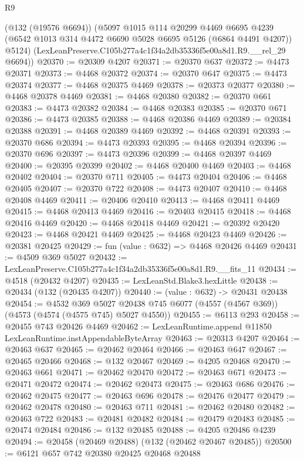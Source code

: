 \begin{lexlean}{R9}
\begin{coremodule}
      (@132 (@19576 @6694))
      (@5097
        @1015
        @114
        @20299
        @4469
        @6695
        @4239
        (@6542 @1013 @314 @4472 @6690 @5028 @6695 @5126 (@6864 @4491 @4207))
        @5124)
      (LexLeanPreserve.C105b277a4c1f34a2db35336f5e00a8d1.R9.__rel_29 @6694))
@20370 := @20309 @4207
@20371 := @20370 @637
@20372 := @4473 @20371
@20373 := @4468 @20372
@20374 := @20370 @647
@20375 := @4473 @20374
@20377 := @4468 @20375 @4469
@20378 := @20373 @20377
@20380 := @4468 @20378 @4469
@20381 := @4468 @20380
@20382 := @20370 @661
@20383 := @4473 @20382
@20384 := @4468 @20383
@20385 := @20370 @671
@20386 := @4473 @20385
@20388 := @4468 @20386 @4469
@20389 := @20384 @20388
@20391 := @4468 @20389 @4469
@20392 := @4468 @20391
@20393 := @20370 @686
@20394 := @4473 @20393
@20395 := @4468 @20394
@20396 := @20370 @696
@20397 := @4473 @20396
@20399 := @4468 @20397 @4469
@20400 := @20395 @20399
@20402 := @4468 @20400 @4469
@20403 := @4468 @20402
@20404 := @20370 @711
@20405 := @4473 @20404
@20406 := @4468 @20405
@20407 := @20370 @722
@20408 := @4473 @20407
@20410 := @4468 @20408 @4469
@20411 := @20406 @20410
@20413 := @4468 @20411 @4469
@20415 := @4468 @20413 @4469
@20416 := @20403 @20415
@20418 := @4468 @20416 @4469
@20420 := @4468 @20418 @4469
@20421 := @20392 @20420
@20423 := @4468 @20421 @4469
@20425 := @4468 @20423 @4469
@20426 := @20381 @20425
@20429 := fun (value : @632) => @4468 @20426 @4469
@20431 := @4509 @369 @5027
@20432 := LexLeanPreserve.C105b277a4c1f34a2db35336f5e00a8d1.R9.__fits_11
@20434 := @4518 (@20432 @4207)
@20435 := LexLeanStd.Blake3.hexLittle
@20438 := @20434 (@132 (@20435 @4207))
@20440 := (value : @632) -> @20431 @20438
@20454 := @4532
    @369
    @5027
    @20438
    @745
    @6077
    (@4557 (@4567 @369))
    (@4573 (@4574 (@4575 @745) @5027 @4550))
@20455 := @6113 @293
@20458 := @20455 @743 @20426 @4469
@20462 := LexLeanRuntime.append @11850 LexLeanRuntime.instAppendableByteArray
@20463 := @20313 @4207
@20464 := @20463 @637
@20465 := @20462 @20464
@20466 := @20463 @647
@20467 := @20465 @20466
@20468 := @132 @20467
@20469 := @4205 @20468
@20470 := @20463 @661
@20471 := @20462 @20470
@20472 := @20463 @671
@20473 := @20471 @20472
@20474 := @20462 @20473
@20475 := @20463 @686
@20476 := @20462 @20475
@20477 := @20463 @696
@20478 := @20476 @20477
@20479 := @20462 @20478
@20480 := @20463 @711
@20481 := @20462 @20480
@20482 := @20463 @722
@20483 := @20481 @20482
@20484 := @20479 @20483
@20485 := @20474 @20484
@20486 := @132 @20485
@20488 := @4205 @20486 @4239
@20494 := @20458 (@20469 @20488) (@132 (@20462 @20467 @20485))
@20500 := @6121 @657 @742 @20380 @20425 @20468 @20488

\end{coremodule}
\end{lexlean}

